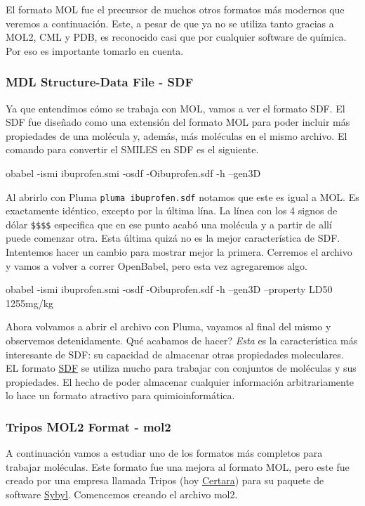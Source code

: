 \documentclass[10pt,letterpaper]{article}
\newcommand{\inlinecode}[1]{
\colorbox{light-gray}{\texttt{#1}}
}
\newenvironment{Code}
{
\begin{lrbox}{\selvestebox}%
\begin{minipage}{\dimexpr\columnwidth-2\fboxsep\relax}
\fontfamily{\ttdefault}\selectfont
}
{\end{minipage}\end{lrbox}%
\begin{center}
\colorbox{light-gray}{\usebox{\selvestebox}}
\end{center}
}
\begin{document}
El formato MOL fue el precursor de muchos otros formatos m\'as modernos que veremos a continuaci\'on. Este, a pesar de que ya no se utiliza tanto gracias a MOL2, CML y PDB, es reconocido casi que por cualquier software de qu\'imica. Por eso es importante tomarlo en cuenta.

\subsubsection{MDL Structure-Data File - SDF}
Ya que entendimos c\'omo se trabaja con MOL, vamos a ver el formato SDF. El SDF fue dise\~nado como una extensi\'on del formato MOL para poder incluir m\'as propiedades de una mol\'ecula y, adem\'as, m\'as mol\'eculas en el mismo archivo. El comando para convertir el SMILES en SDF es el siguiente.

\begin{Code}
obabel -ismi ibuprofen.smi -osdf -Oibuprofen.sdf -h --gen3D
\end{Code}

Al abrirlo con Pluma \inlinecode{pluma ibuprofen.sdf} notamos que este es igual a MOL. Es exactamente id\'entico, excepto por la \'ultima l\'ina. La l\'inea con los 4 signos de d\'olar \inlinecode{\$\$\$\$} especifica que en ese punto acab\'o una mol\'ecula y a partir de all\'i puede comenzar otra. Esta \'ultima quiz\'a no es la mejor caracter\'istica de SDF. Intentemos hacer un cambio para mostrar mejor la primera. Cerremos el archivo y vamos a volver a correr OpenBabel, pero esta vez agregaremos algo.

\begin{Code}
obabel -ismi ibuprofen.smi -osdf -Oibuprofen.sdf -h --gen3D --property LD50 1255mg/kg
\end{Code}

Ahora volvamos a abrir el archivo con Pluma, vayamos al final del mismo y observemos detenidamente. Qu\'e acabamos de hacer? \emph{Esta} es la caracter\'istica m\'as interesante de SDF: su capacidad de almacenar otras propiedades moleculares.\\

EL formato \href{http://molmatinf.com/whynotmolsdf.html}{SDF} se utiliza mucho para trabajar con conjuntos de mol\'eculas y sus propiedades. El hecho de poder almacenar cualquier informaci\'on arbitrariamente lo hace un formato atractivo para quimioinform\'atica.

\subsubsection{Tripos MOL2 Format - mol2}
A continuaci\'on vamos a estudiar uno de los formatos m\'as completos para trabajar mol\'eculas. Este formato fue una mejora al formato MOL, pero este fue creado por una empresa llamada Tripos (hoy \href{https://www.certara.com/}{Certara}) para su paquete de software \href{https://www.certara.com/software/molecular-modeling-and-simulation/sybyl-x-suite/}{Sybyl}. Comencemos creando el archivo mol2.
\end{document}
